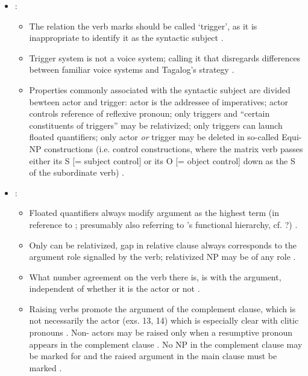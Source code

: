 \begin{itemize}
	\item \citet[1674--1676]{schachter2015}:
	\begin{itemize}
		\item The relation the verb marks should be called `trigger', as it is
		inappropriate to identify it as the syntactic subject
		\citep[1674]{schachter2015}.

		\item Trigger system is not a voice system; calling it that disregards
		differences between familiar voice systems and Tagalog's strategy
		\citep[1674]{schachter2015}.

		\item Properties commonly associated with the syntactic subject are
		divided bewteen actor and trigger: actor is the addressee of
		imperatives; actor controls reference of reflexive pronoun; only
		triggers and ``certain constituents of triggers'' may be relativized;
		only triggers can launch floated quantifiers; only actor \emph{or}
		trigger may be deleted in so-called Equi-NP constructions (i.e. control
		constructions, where the matrix verb passes either its S [= subject
		control] or its O [= object control] down as the S of the subordinate
		verb) \citep[1675]{schachter2015}.
	\end{itemize}

	\item \citet[19--52]{kroeger1991}:
	\begin{itemize}
		\item Floated quantifiers always modify \Nom{} argument as the
		highest term (in reference to \cite[501]{schachter1976}; presumably
		also referring to \Lfg{}'s functional hierarchy, cf.
		\cite[230--231]{bresnan2016}?) \citep[23]{kroeger1991}.

		\item Only \Nom{} can be relativized, gap in relative clause always
		corresponds to the argument role signalled by the verb; relativized NP
		may be of any role \citep[23--24]{kroeger1991}.

		\item What number agreement on the verb there is, is with the \Nom{}
		argument, independent of whether it is the actor or not
		\citep[24--25]{kroeger1991}.

		\item Raising verbs promote the \Nom{} argument of the complement
		clause, which is not necessarily the actor (exs. 13, 14) which is
		especially clear with clitic pronouns \citep[26]{kroeger1991}.
		Non-\Nom{} actors may be raised only when a resumptive pronoun appears
		in the complement clause \citep[28]{kroeger1991}. No NP in the
		complement clause may be marked for \Nom{} and the raised argument in
		the main clause must be marked \Nom{} \cite[29]{kroeger1991}.


\end{itemize}
\end{itemize}
